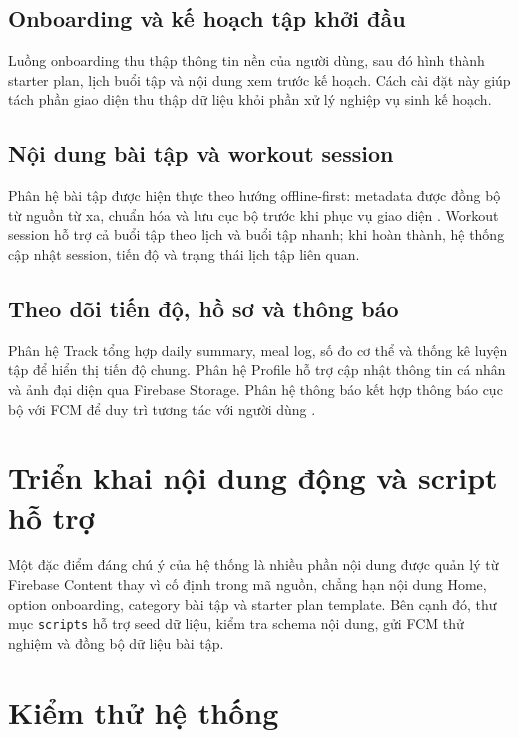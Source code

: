 \subsection{Onboarding và kế hoạch tập khởi đầu}

Luồng onboarding thu thập thông tin nền của người dùng, sau đó hình thành starter plan, lịch buổi tập và nội dung xem trước kế hoạch. Cách cài đặt này giúp tách phần giao diện thu thập dữ liệu khỏi phần xử lý nghiệp vụ sinh kế hoạch.

\subsection{Nội dung bài tập và workout session}

Phân hệ bài tập được hiện thực theo hướng offline-first: metadata được đồng bộ từ nguồn từ xa, chuẩn hóa và lưu cục bộ trước khi phục vụ giao diện \cite{firebase_firestore,android_room,android_workmanager}. Workout session hỗ trợ cả buổi tập theo lịch và buổi tập nhanh; khi hoàn thành, hệ thống cập nhật session, tiến độ và trạng thái lịch tập liên quan.

\subsection{Theo dõi tiến độ, hồ sơ và thông báo}

Phân hệ Track tổng hợp daily summary, meal log, số đo cơ thể và thống kê luyện tập để hiển thị tiến độ chung. Phân hệ Profile hỗ trợ cập nhật thông tin cá nhân và ảnh đại diện qua Firebase Storage. Phân hệ thông báo kết hợp thông báo cục bộ với FCM để duy trì tương tác với người dùng \cite{firebase_storage,firebase_fcm}.

\section{Triển khai nội dung động và script hỗ trợ}

Một đặc điểm đáng chú ý của hệ thống là nhiều phần nội dung được quản lý từ Firebase Content thay vì cố định trong mã nguồn, chẳng hạn nội dung Home, option onboarding, category bài tập và starter plan template. Bên cạnh đó, thư mục \texttt{scripts} hỗ trợ seed dữ liệu, kiểm tra schema nội dung, gửi FCM thử nghiệm và đồng bộ dữ liệu bài tập.

\section{Kiểm thử hệ thống}

